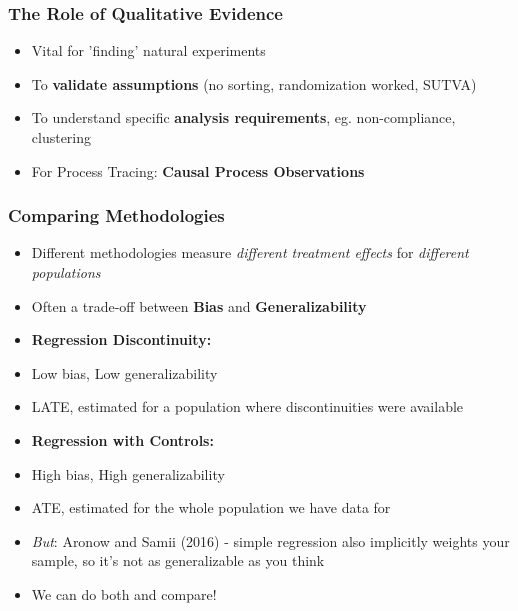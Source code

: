 \documentclass[xcolor=x11names,compress]{beamer}\usepackage[]{graphicx}\usepackage[]{color}
\renewcommand{\(}{\begin{columns}}
\renewcommand{\)}{\end{columns}}
\newcommand{\<}[1]{\begin{column}{#1}}
\renewcommand{\>}{\end{column}}
\begin{document}
\begin{frame}
\frametitle{The Role of Qualitative Evidence}
\begin{itemize}
\item Vital for 'finding' natural experiments
\pause
\item To \textbf{validate assumptions} (no sorting, randomization worked, SUTVA)
\pause
\item To understand specific \textbf{analysis requirements}, eg. non-compliance, clustering
\pause
\item For Process Tracing: \textbf{Causal Process Observations}
\end{itemize}
\end{frame}

\begin{frame}
\frametitle{Comparing Methodologies}
\begin{itemize}
\item Different methodologies measure \textit{different treatment effects} for \textit{different populations}
\pause
\item Often a trade-off between \textbf{Bias} and \textbf{Generalizability}
\end{itemize}
\pause
\begin{multicols}{2}
\begin{itemize}
\item \textbf{Regression Discontinuity:}
\pause
\item Low bias, Low generalizability
\pause
\item LATE, estimated for a population where discontinuities were available
\end{itemize}
\columnbreak
\begin{itemize}
\item \textbf{Regression with Controls:}
\pause
\item High bias, High generalizability
\pause
\item ATE, estimated for the whole population we have data for
\pause
\item \textit{But}: Aronow and Samii (2016) - simple regression also implicitly weights your sample, so it's not as generalizable as you think
\end{itemize}
\end{multicols}
\begin{itemize}
\item We can do both and compare!
\end{itemize}
\end{frame}
\end{document}
